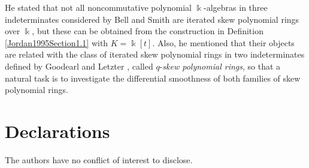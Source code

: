 \documentclass{amsart}
\theoremstyle{definition}
\theoremstyle{remark}
\numberwithin{equation}{section}
\begin{document}
He stated \cite[Section 1]{Jordan1995} that not all noncommutative polynomial $\Bbbk$-algebras in three indeterminates considered by Bell and Smith \cite{BellSmith1990} are iterated skew polynomial rings over $\Bbbk$, but these can be obtained from the construction in Definition \ref{Jordan1995Section1.1} with $K = \Bbbk[t]$. Also, he mentioned that their objects are related with the class of iterated skew polynomial rings in two indeterminates defined by Goodearl and Letzter \cite{GoodearlLetzter1994}, called $q$-{\em skew polynomial rings}, so that a natural task is to investigate the differential smoothness of both families of skew polynomial rings.


\section{Declarations}

The authors have no conflict of interest to disclose.
\end{document}
